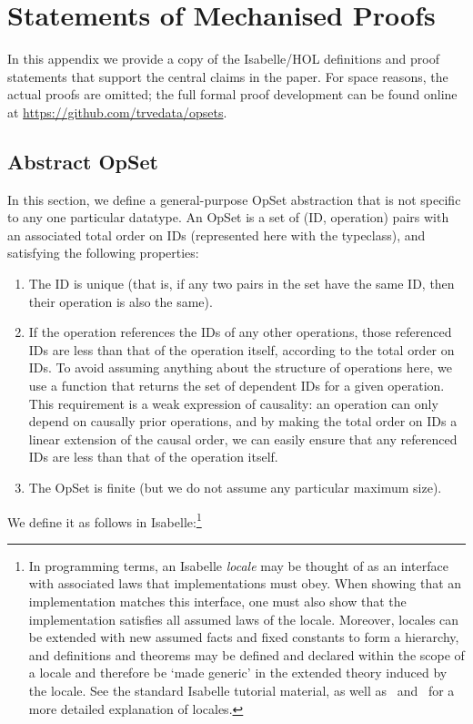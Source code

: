 \section{Statements of Mechanised Proofs}
\label{sect:appendix:statements}

In this appendix we provide a copy of the Isabelle/HOL definitions and proof statements that support the central claims in the paper.
For space reasons, the actual proofs are omitted; the full formal proof development can be found online at \url{https://github.com/trvedata/opsets}.

\subsection{Abstract OpSet}\label{sec:abstract-opset}

In this section, we define a general-purpose OpSet abstraction that is not specific to any one particular datatype.
An OpSet is a set of (ID, operation) pairs with an associated total order on IDs (represented here with the  typeclass), and satisfying the following properties:
\begin{enumerate}
\item The ID is unique (that is, if any two pairs in the set have the same ID, then their operation is also the same).
\item If the operation references the IDs of any other operations, those referenced IDs are less than that of the operation itself, according to the total order on IDs.
To avoid assuming anything about the structure of operations here, we use a function  that returns the set of dependent IDs for a given operation.
This requirement is a weak expression of causality: an operation can only depend on causally prior operations, and by making the total order on IDs a linear extension of the causal order, we can easily ensure that any referenced IDs are less than that of the operation itself.
\item The OpSet is finite (but we do not assume any particular maximum size).
\end{enumerate}
We define it as follows in Isabelle:\footnote{In programming terms, an Isabelle \emph{locale} may be thought of as an interface with associated laws that implementations must obey.
When showing that an implementation matches this interface, one must also show that the implementation satisfies all assumed laws of the locale.
Moreover, locales can be extended with new assumed facts and fixed constants to form a hierarchy, and definitions and theorems may be defined and declared within the scope of a locale and therefore be `made generic' in the extended theory induced by the locale.
See the standard Isabelle tutorial material, as well as~\cite{DBLP:conf/tphol/KammullerWP99} and~\cite{DBLP:conf/types/HaftmannW08} for a more detailed explanation of locales.}
